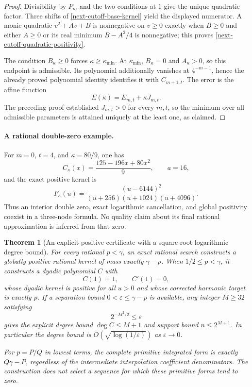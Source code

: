 \documentclass[11pt,a4paper]{article}
\newtheorem{theorem}{Theorem}[section]
\theoremstyle{definition}
\theoremstyle{remark}
\begin{document}
\begin{proof}
Divisibility by $P_m$ and the two conditions at $1$ give the unique
quadratic factor. Three shifts of \eqref{next-cutoff-base-kernel} yield
the displayed numerator. A monic quadratic $v^2+Av+B$ is nonnegative
on $v\ge0$ exactly when $B\ge0$ and either $A\ge0$ or its real minimum
$B-A^2/4$ is nonnegative; this proves
\eqref{next-cutoff-quadratic-positivity}.

The condition $B_\kappa\ge0$ forces $\kappa\ge\kappa_{\min}$.
At $\kappa_{\min}$, $B_\kappa=0$ and $A_\kappa>0$, so this endpoint is
admissible. Its polynomial additionally vanishes at $4^{-m-1}$, hence
the already proved polynomial identity identifies it with $C_{m+1,t}$.
The error is the affine function
\[
 E(\kappa)=E_{m,t}+\kappa J_{m,t}.
\]
The preceding proof established $J_{m,t}>0$ for every $m,t$, so the
minimum over all admissible parameters is attained uniquely at the
least one, as claimed.
\end{proof}

\paragraph{A rational double-zero example.}
For $m=0$, $t=4$, and $\kappa=80/9$, one has
\[
 C_\kappa(x)=\frac{125-196x+80x^2}{9},\qquad a=16,
\]
and the exact positive kernel is
\[
 F_\kappa(u)=
 \frac{(u-6144)^2}
 {(u+256)(u+1024)(u+4096)}.
\]
Thus an interior double zero, exact logarithmic cancellation, and global
positivity coexist in a three-node formula. No quality claim about its
final rational approximation is inferred from that zero.

\begin{theorem}[An explicit positive certificate with a square-root logarithmic degree bound]
\label{next-cutoff-interpolation}
For every rational $p<\gamma$, an exact rational search constructs a
globally positive rational kernel of mass exactly $\gamma-p$.
When $1/2\le p<\gamma$, it constructs a dyadic polynomial $C$ with
\[
 C(1)=1,\qquad C'(1)=0,
\]
whose dyadic kernel is positive for all $u>0$ and whose corrected harmonic
target is exactly $p$. If a separation bound
$0<\varepsilon\le\gamma-p$ is available, any integer $M\ge32$ satisfying
\[
 2^{-M^2/2}\le\varepsilon
\]
gives the explicit degree bound $\deg C\le M+1$ and support bound
$n\le2^{M+1}$. In particular the degree bound is
$O(\sqrt{\log(1/\varepsilon)})$ as $\varepsilon\to0$.

For $p=P/Q$ in lowest terms, the complete primitive integrated form is
exactly $Q\gamma-P$, regardless of the intermediate interpolation
coefficient denominators. The construction does not select a sequence
for which these primitive forms tend to zero.
\end{theorem}
\end{document}
